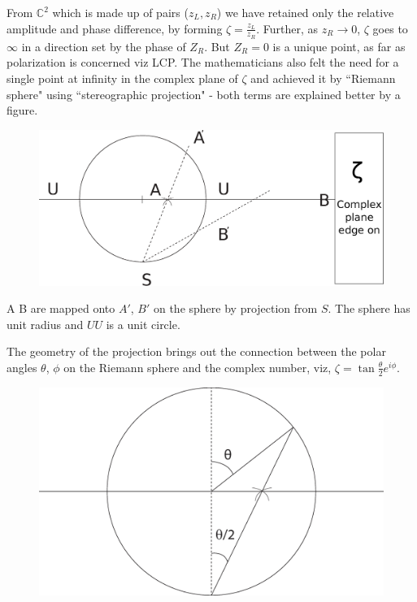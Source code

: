From $\mathbb{C}^2$ which is made up of pairs ($z_L , z_R$) we have retained only the relative
amplitude and phase difference, by forming $\zeta = \frac{z_L}{z_R}$. Further, as $z_R \to 0$, $\zeta$
goes to $\infty$ in a direction set by the phase of $Z_R$. But $Z_R = 0$ is a unique point,
as far as polarization is concerned viz LCP. The mathematicians also felt the
need for a single point at infinity in the complex plane of $\zeta$ and achieved it by
``Riemann sphere" using  ``stereographic projection" - both terms are explained
better by a figure.
\begin{figure}[H]
\centering
\includegraphics[scale=0.1]{src/images/chap26/4.eps}
\end{figure}


A B are mapped onto $A'$, $B'$ on the sphere by projection from $S$. The sphere
has unit radius and $U U$ is a unit circle.


The geometry of the projection brings out the connection between the polar
angles $\theta$, $\phi$ on the Riemann sphere and the complex number, viz, $\zeta = \tan \frac{\theta}{2} e^{i\phi}$.
\begin{figure}[H]
\centering
\includegraphics[scale=0.1]{src/images/chap26/5.eps}
\end{figure}

